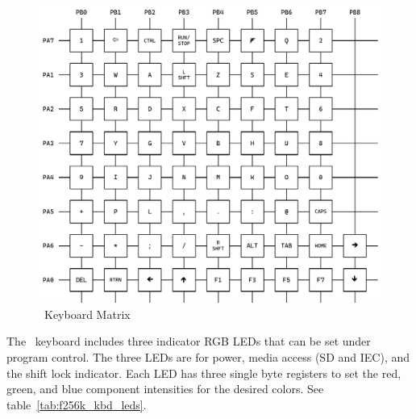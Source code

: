 \begin{figure}[ht]
    \begin{center}
        \includegraphics[scale=0.65]{images/f256k_matrix.pdf}
    \end{center}
    \caption{\fk\ Keyboard Matrix}
    \label{fig:f256k_matrix}
\end{figure}

The \fk\ keyboard includes three indicator RGB LEDs that can be set under program control. The three LEDs are for power, media access (SD and IEC), and the shift lock indicator. Each LED has three single byte registers to set the red, green, and blue component intensities for the desired colors. See table~\ref{tab:f256k_kbd_leds}.

